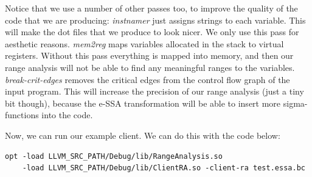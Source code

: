 \documentclass{paper}
\begin{document}
Notice that we use a number of other passes too, to improve the quality of the code that we are producing:
\textit{instnamer} just assigns strings to each variable. This will make the dot files that we produce to look nicer. We only use this pass for aesthetic reasons.
\textit{mem2reg} maps variables allocated in the stack to virtual registers. Without this pass everything is mapped into memory, and then our range analysis will not be able to find any meaningful ranges to the variables.
\textit{break-crit-edges} removes the critical edges from the control flow graph of the input program. This will increase the precision of our range analysis (just a tiny bit though), because the e-SSA transformation will be able to insert more sigma-functions into the code.

Now, we can run our example client. We can do this with the code below:
\begin{lstlisting}[frame=single]
opt -load LLVM_SRC_PATH/Debug/lib/RangeAnalysis.so 
    -load LLVM_SRC_PATH/Debug/lib/ClientRA.so -client-ra test.essa.bc
\end{lstlisting}






\end{document}
